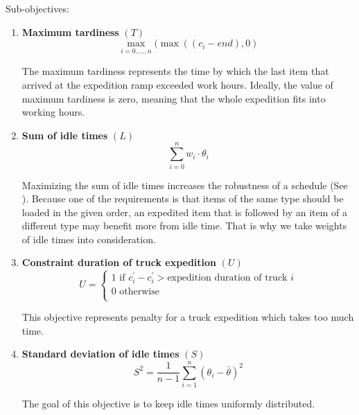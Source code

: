 \documentclass{ctuthesis}
\begin{document}
Sub-objectives:

\begin{enumerate}
\item \textbf{Maximum tardiness} $(T)$\\ \begin{equation}\max_{i=0,\ldots,n}(\max((c_i - end), 0)\end{equation}

The maximum tardiness represents the time by which the last item that arrived at the expedition ramp exceeded work hours. Ideally, the value of maximum tardiness is zero, meaning that the whole expedition fits into working hours.

\item \textbf{Sum of idle times} $(L)$\\ 
\begin{equation}
    \sum_{i=0}^{n} w_i \cdot \theta_i
\end{equation}

Maximizing the sum of idle times increases the robustness of a schedule (See \cite{pinedo}). Because one of the requirements is that items of the same type should be loaded in the given order, an expedited item that is followed by an item of a different type may benefit more from idle time. That is why we take weights of idle times into consideration.

\item \textbf{Constraint duration of truck expedition} $(U)$
\begin{equation} 
   U = \begin{cases}
        1 \text{ if } c_i^{'} - c_i^{'} > \text{expedition duration of truck } i\\
        \text{0 otherwise}\\
       \end{cases}
\end{equation}

This objective represents penalty for a truck expedition which takes too much time.

\item \textbf{Standard deviation of idle times} $(S)$
\begin{equation} 
    S^2=\frac{1}{n-1}\sum_{i=1}^{n} (\theta_{i} -\bar{\theta})^2 
\end{equation}

The goal of this objective is to keep idle times uniformly distributed. 

\end{enumerate}
 
\end{document}
